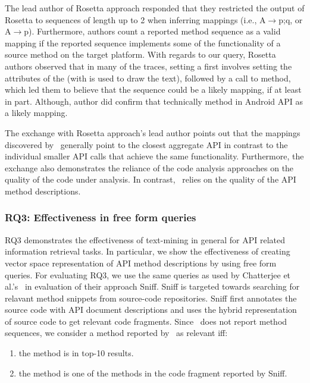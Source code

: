 The lead author of Rosetta approach responded that they restricted the output of
Rosetta to sequences of length up to 2 when inferring mappings (i.e., {A$\rightarrow$p;q}, or {A$\rightarrow$p}). Furthermore, authors count a reported method sequence as a valid mapping
if the reported sequence implements some of the functionality of a source method on the target platform.
With regards to our query, Rosetta authors observed that in many of the traces, setting a  first involves setting the attributes of the  (with is used to draw the text), followed by a call to  method, which led them to believe that the sequence    could be a likely mapping, if at least in part.
Although, author did confirm that technically  method in Android API as a likely mapping.

The exchange with Rosetta approach's lead author points out that
the mappings discovered by \tool\ generally point to
the closest aggregate API in contrast to the individual smaller API calls
that achieve the same functionality.
Furthermore, the exchange also demonstrates the reliance of the
code analysis approaches on the quality of the code under analysis.
In contrast, \tool\ relies on the quality of the API method descriptions.


\subsubsection{RQ3: Effectiveness in free form queries}

RQ3 demonstrates the effectiveness of text-mining in general for API related information retrieval tasks.
In particular, we show the effectiveness of creating vector space representation of
API method descriptions by using free form queries.
For evaluating RQ3, we use the same queries as used by Chatterjee et al.'s~\cite{chatterjee2009sniff} in evaluation of their approach Sniff.
Sniff is targeted towards searching for relavant method snippets from source-code repositories. Sniff first annotates the source code with API document descriptions and uses the hybrid representation of source code to get relevant code fragments. 
Since \tool\ does not report method sequences, we consider a method reported by \tool\ as relevant iff:

\begin{enumerate}
	\item the method is in top-10 results.
	\item the method is one of the methods in the code fragment reported by Sniff.
\end{enumerate}

